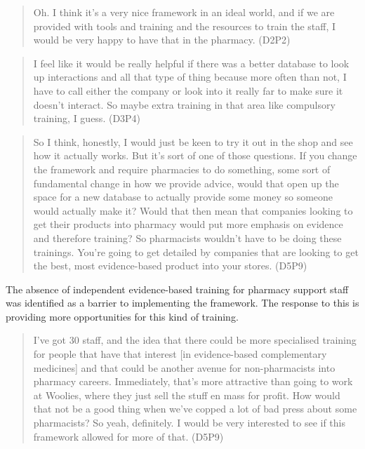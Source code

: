 \documentclass[12pt,]{article}
\begin{document}
\begin{quote}
Oh. I think it's a very nice framework in an ideal world, and if we are
provided with tools and training and the resources to train the staff, I
would be very happy to have that in the pharmacy. (D2P2)
\end{quote}

\begin{quote}
I feel like it would be really helpful if there was a better database to
look up interactions and all that type of thing because more often than
not, I have to call either the company or look into it really far to
make sure it doesn't interact. So maybe extra training in that area like
compulsory training, I guess. (D3P4)
\end{quote}

\begin{quote}
So I think, honestly, I would just be keen to try it out in the shop and
see how it actually works. But it's sort of one of those questions. If
you change the framework and require pharmacies to do something, some
sort of fundamental change in how we provide advice, would that open up
the space for a new database to actually provide some money so someone
would actually make it? Would that then mean that companies looking to
get their products into pharmacy would put more emphasis on evidence and
therefore training? So pharmacists wouldn't have to be doing these
trainings. You're going to get detailed by companies that are looking to
get the best, most evidence-based product into your stores. (D5P9)
\end{quote}

The absence of independent evidence-based training for pharmacy support
staff was identified as a barrier to implementing the framework. The
response to this is providing more opportunities for this kind of
training.

\begin{quote}
I've got 30 staff, and the idea that there could be more specialised
training for people that have that interest {[}in evidence-based
complementary medicines{]} and that could be another avenue for
non-pharmacists into pharmacy careers. Immediately, that's more
attractive than going to work at Woolies, where they just sell the stuff
en mass for profit. How would that not be a good thing when we've copped
a lot of bad press about some pharmacists? So yeah, definitely. I would
be very interested to see if this framework allowed for more of that.
(D5P9)
\end{quote}
\end{document}
